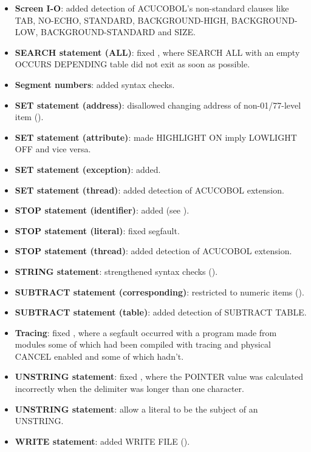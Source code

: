 \begin{itemize}
\item \textbf{Screen I-O}: added detection of ACUCOBOL's non-standard clauses like TAB, NO-ECHO, STANDARD, BACKGROUND-HIGH, BACKGROUND-LOW, BACKGROUND-STANDARD and SIZE.
\item \textbf{SEARCH statement (ALL)}: fixed , where SEARCH ALL with an empty OCCURS DEPENDING table did not exit as soon as possible.
\item \textbf{Segment numbers}: added syntax checks.
\item \textbf{SET statement (address)}: disallowed changing address of non-01\slash{}77-level item ().
\item \textbf{SET statement (attribute)}: made HIGHLIGHT ON imply LOWLIGHT OFF and vice versa.
\item \textbf{SET statement (exception)}: added.
\item \textbf{SET statement (thread)}: added detection of ACUCOBOL extension.
\item \textbf{STOP statement (identifier)}: added (see ).
\item \textbf{STOP statement (literal)}: fixed segfault.
\item \textbf{STOP statement (thread)}: added detection of ACUCOBOL extension.
\item \textbf{STRING statement}: strengthened syntax checks ().
\item \textbf{SUBTRACT statement (corresponding)}: restricted to numeric items ().
\item \textbf{SUBTRACT statement (table)}: added detection of SUBTRACT TABLE.
\item \textbf{Tracing}: fixed , where a segfault occurred with a program made from modules some of which had been compiled with tracing and physical CANCEL %
enabled and some of which hadn't.
\item \textbf{UNSTRING statement}: fixed , where the POINTER value was calculated incorrectly when the delimiter was longer than one character.
\item \textbf{UNSTRING statement}: allow a literal to be the subject of an UNSTRING.
\item \textbf{WRITE statement}: added WRITE FILE ().
\end{itemize}

